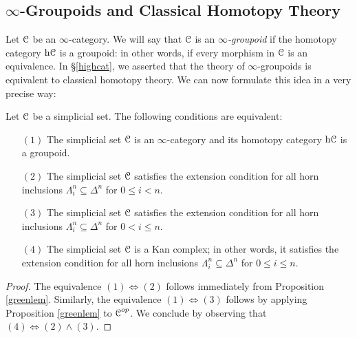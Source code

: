 \subsection{$\infty$-Groupoids and Classical Homotopy Theory}
\begin{1.2.5 inf-gpoids and classical homotopy}
Let $\operatorname{\mathcal{C}}$ be an $\infty$-category. We will say that $\operatorname{\mathcal{C}}$ is an {\it $\infty$-groupoid} if the homotopy category $\rm{h} \it{\operatorname{\mathcal{C}}}$ is a groupoid: in other words, if every morphism in $\operatorname{\mathcal{C}}$ is an equivalence. In \S \ref{highcat}, we asserted that the theory of $\infty$-groupoids is equivalent to classical homotopy theory. We can now formulate this idea in a very precise way:

\begin{proposition}\label{greenwich}
Let $\operatorname{\mathcal{C}}$ be a simplicial set. The following conditions are
equivalent:

\begin{itemize}
\item[$(1)$] The simplicial set $\operatorname{\mathcal{C}}$ is an $\infty$-category and its homotopy category $\rm{h} \it{\operatorname{\mathcal{C}}}$ is a groupoid.

\item[$(2)$] The simplicial set $\operatorname{\mathcal{C}}$ satisfies the extension condition
for all horn inclusions $\Lambda^n_i \subseteq \Delta^n$ for $0 \leq i < n$.

\item[$(3)$] The simplicial set $\operatorname{\mathcal{C}}$ satisfies the extension condition
for all horn inclusions $\Lambda^n_i \subseteq \Delta^n$ for $0 < i \leq n$.

\item[$(4)$] The simplicial set $\operatorname{\mathcal{C}}$ is a Kan complex; in other words, it
satisfies the extension condition for all horn inclusions
$\Lambda^n_i \subseteq \Delta^n$ for $0 \leq i \leq n$.
\end{itemize}
\end{proposition}

\begin{proof}
The equivalence $(1) \Leftrightarrow (2)$ follows immediately from
Proposition \ref{greenlem}.
Similarly, the equivalence $(1) \Leftrightarrow (3)$ follows by applying Proposition \ref{greenlem} to $\operatorname{\mathcal{C}}^{op}$. We conclude by observing that $(4) \Leftrightarrow (2) \wedge (3)$.
\end{proof}


\end{1.2.5 inf-gpoids and classical homotopy}
